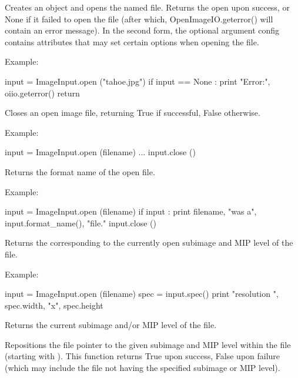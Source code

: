 Creates an \ImageInput object and opens the named file.  Returns the
open \ImageInput upon success, or {\cf None} if it failed to open the
file (after which, {\cf OpenImageIO.geterror()} will contain an error
message).  In the second form, the optional \ImageSpec argument 
{\cf config} contains attributes that may set certain options when opening
the file.

\noindent Example:
\begin{code}
    input = ImageInput.open ("tahoe.jpg")
    if input == None :
        print "Error:", oiio.geterror()
        return
\end{code}
\apiend

Closes an open image file, returning {\cf True} if successful, {\cf False}
otherwise.

\noindent Example:
\begin{code}
    input = ImageInput.open (filename)
    ...
    input.close ()
\end{code}
\apiend


Returns the format name of the open file.

\noindent Example:
\begin{code}
    input = ImageInput.open (filename)
    if input :
        print filename, "was a", input.format_name(), "file."
        input.close ()
  
\end{code}
\apiend

Returns the \ImageSpec corresponding to the currently open subimage and
MIP level of the file.

\noindent Example:
\begin{code}
    input = ImageInput.open (filename)
    spec = input.spec()
    print "resolution ", spec.width, "x", spec.height
\end{code}
\apiend

Returns the current subimage and/or MIP level of the file.
\apiend

Repositions the file pointer to the given subimage and MIP level within the
file (starting with {}).  This function returns {\cf True} upon success,
{\cf False} upon failure (which may include the file not having the
specified subimage or MIP level).

